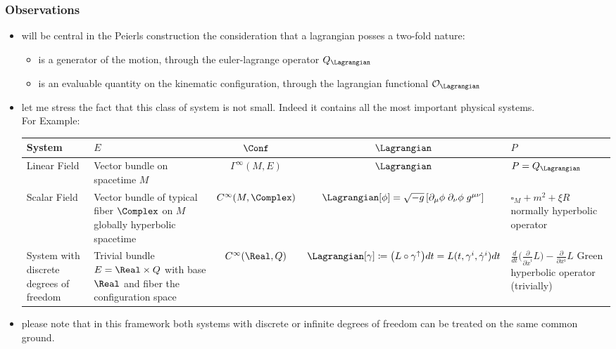 \documentclass[a4paper,11pt]{scrartcl}
\begin{document}
	\subsubsection*{Observations}
	\begin{itemize}
		\item will be central in the Peierls construction the consideration that a lagrangian posses a two-fold nature:
		\begin{itemize}
			\item is a generator of the motion, through the euler-lagrange operator $Q_\Lagrangian$
			\item is an evaluable quantity on the kinematic configuration, through the lagrangian functional $ \mathcal{O}_\Lagrangian$
		\end{itemize}
		\item let me stress the fact that this class of system is not small. Indeed it contains all the most important physical systems. \\
		For Example:
		
		\begin{tabular}{|p{3cm}|p{3cm}|c|c|p{3cm}|}
			\hline
			System & $E$  & $\Conf$ & $\Lagrangian$ & $P$ \\
			\hline
			Linear Field & \footnotesize{Vector bundle on spacetime} $M$ & $\Gamma^\infty(M,E)$ & $\Lagrangian$ & $P=Q_\Lagrangian$ \\
			\hline
			Scalar Field &
			\footnotesize{Vector bundle of typical fiber $\Complex$ on $M$ globally hyperbolic spacetime}&
			$C^\infty(M, \Complex)$ &
			$\Lagrangian[\phi] = \sqrt{-g} \left[ \partial_\mu \phi \; \partial_\nu \phi \; g^{\mu \nu} \right]$ &
			$\square_M + m^2 + \xi R$
			\newline
			\footnotesize{normally hyperbolic operator}\\
			\hline
			System with discrete degrees of freedom & 
			\footnotesize{Trivial bundle $E=\Real\times Q$ with base $\Real$ and fiber the configuration space} &
			$C^\infty(\Real,Q)$ &
			$\Lagrangian  [\gamma] \coloneqq \big( L \circ	\gamma^\uparrow \big) dt  = L(t,\gamma^i,\dot{\gamma}^i) dt$ &
			$\frac{d}{dt}\big(\frac{\partial}{\partial \dot{x}^i}L\big)-\frac{\partial}{\partial x^i}L $ 	
						\newline
			\footnotesize{Green hyperbolic operator (trivially)} \\			
			\hline
		\end{tabular}
		
		\item please note that in this framework both systems with discrete or infinite degrees of freedom can be treated on the same common ground.
	\end{itemize}
	\newpage
\end{document}
